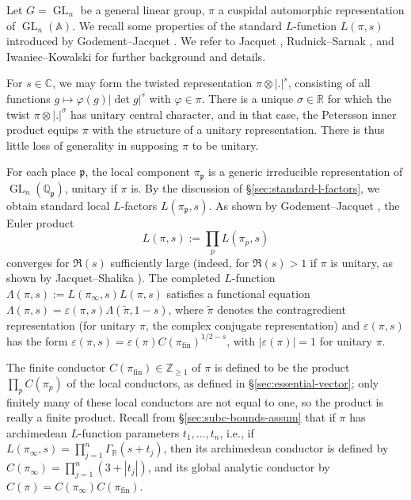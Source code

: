 \documentclass[reqno]{amsart}
\DeclareMathOperator{\GL}{GL}
\def\eps{\varepsilon}
\DeclareMathOperator{\fin}{fin}
\theoremstyle{plain} \newtheorem{theorem} {Theorem}
\theoremstyle{definition} \newtheorem{definition} [theorem] {Definition}
\theoremstyle{itplain} %
\numberwithin{equation}{section}
\numberwithin{theorem}{section}
\renewcommand{\geq}{\geqslant}
\begin{document}
Let $G = \GL_n$ be a general linear group, $\pi$ a cuspidal automorphic representation of $\GL_n(\mathbb{A})$.  We recall some properties of the standard $L$-function $L(\pi,s)$ introduced by Godement--Jacquet \cite[Lemma 10.20]{MR0342495}.  We refer to Jacquet \cite{MR546609}, Rudnick--Sarnak \cite[\S2]{MR1395406}, and Iwaniec--Kowalski \cite[\S5]{MR2061214} for further background and details.

For $s \in \mathbb{C}$, we may form the twisted representation $\pi \otimes |.|^s$, consisting of all functions $g \mapsto \varphi(g) |\det g|^s$ with $\varphi \in \pi$.  There is a unique $\sigma \in \mathbb{R}$ for which the twist $\pi \otimes |.|^\sigma$ has unitary central character, and in that case, the Petersson inner product equips $\pi$ with the structure of a unitary representation.  There is thus little loss of generality in supposing $\pi$ to be unitary.

For each place $\mathfrak{p}$, the local component $\pi_\mathfrak{p}$ is a generic irreducible representation of $\GL_n(\mathbb{Q}_\mathfrak{p})$, unitary if $\pi$ is.  By the discussion of \S\ref{sec:standard-l-factors}, we obtain standard local $L$-factors $L(\pi_\mathfrak{p},s)$.  As shown by Godement--Jacquet \cite[Lemma 10.20]{MR0342495}, the Euler product
\begin{equation*}
  L(\pi,s) := \prod_p L(\pi_p,s)
\end{equation*}
converges for $\Re(s)$ sufficiently large (indeed, for $\Re(s) > 1$ if $\pi$ is unitary, as shown by Jacquet--Shalika \cite[I, Thm 5.3]{MR618323}).  The completed $L$-function $\Lambda(\pi,s) := L(\pi_\infty,s) L(\pi,s)$ satisfies a functional equation $\Lambda(\pi,s) = \eps(\pi,s) \Lambda(\tilde{\pi},1-s)$, where $\tilde{\pi}$ denotes the contragredient representation (for unitary $\pi$, the complex conjugate representation) and $\eps(\pi,s)$ has the form $\eps(\pi,s) = \eps(\pi) C(\pi_{\fin})^{1/2-s}$, with $|\eps(\pi)| = 1$ for unitary $\pi$.

The finite conductor $C(\pi_{\fin}) \in \mathbb{Z}_{\geq 1}$ of $\pi$ is defined to be the product $\prod_p C(\pi_p)$ of the local conductors, as defined in \S\ref{sec:essential-vector}; only finitely many of these local conductors are not equal to one, so the product is really a finite product.  Recall from \S\ref{sec:subc-bounds-assum} that if $\pi$ has archimedean $L$-function parameters $t_1,\dotsc,t_n$, i.e., if $L(\pi_\infty, s) = \prod_{j=1}^n \Gamma_{\mathbb{R}}(s + t_j)$, then its archimedean conductor is defined by $C(\pi_\infty) = \prod_{j=1}^n (3 + |t_j|)$, and its global analytic conductor by $C(\pi) = C(\pi_\infty) C(\pi_{\fin})$.
\end{document}
